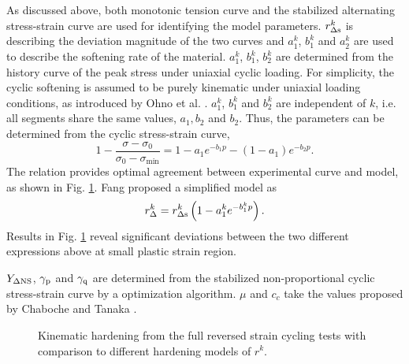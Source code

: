 \documentclass[preprint,5p,twocolumn,11pt,sort&compress]{elsarticle}
\begin{document}
As discussed above, both monotonic tension curve and the stabilized alternating stress-strain curve are used for identifying the model parameters.
$r_{\Delta \rm s}^k$ is describing the deviation magnitude of the two curves and $a_{1}^k$, $b_{1}^k$ and $a_{2}^k$ are used to describe the softening rate of the material.
$a_1^k$, $b_1^k$, $b_2^k$ are determined from the history curve of the peak stress under uniaxial cyclic loading. For simplicity, the cyclic softening is assumed to be purely kinematic under uniaxial loading conditions, as introduced by Ohno et al. \cite{Ohno1993375}.
$a_{1}^k$, $b_{1}^k$ and $b_{2}^k$ are independent of $k$, i.e. all segments share the same values, $a_1, b_2$ and $b_2$.
Thus, the parameters can be determined from the cyclic stress-strain curve,
\begin{equation}
1 - \frac{{\sigma  - {\sigma _0}}}{{{\sigma _0} - {\sigma _{\min }}}} = 1 - a_1{e^{ - b_1 p}} - \left( {1 - a_1} \right){e^{ - b_2 p}}.
\end{equation}
The relation provides optimal agreement between experimental curve and model, as shown in Fig.  \ref{Fig:Fitting300C_7041_Plot}. Fang \cite{fang2015cyclic} proposed a simplified model as
\begin{equation}
r_\Delta ^k = r_{\Delta \rm s}^k\left( 1 - a_1^k{e^{ - b_1^kp}}\right).
\label{Equ:fangrdeltak}
\end{equation}
Results in Fig. \ref{Fig:Fitting300C_7041_Plot} reveal significant deviations between the two different expressions above at small plastic strain region.

$Y_{\Delta \rm NS}$, $\gamma_{\rm p}$ and $\gamma_{\rm q}$ are determined from the stabilized non-proportional cyclic stress-strain curve by a optimization algorithm.
$\mu$ and $c_c$ take the values proposed by Chaboche \cite{Chaboche1986149} and Tanaka \cite{tanaka1994nonproportionality}.


\begin{figure}[!htp]
\caption{Kinematic hardening from the full reversed strain cycling tests with comparison to different hardening models of $r^k$.}
\label{Fig:Fitting300C_7041_Plot}
\end{figure}
\end{document}
